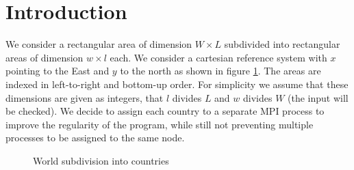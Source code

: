\section{Introduction}

We consider a rectangular area of dimension $W \times L$ subdivided into rectangular areas of dimension $w \times l$ each. We consider a cartesian reference system with $x$ pointing to the East and $y$ to the north as shown in figure \ref{fig:area_subdivision}. The areas are indexed in left-to-right and bottom-up order.
For simplicity we assume that these dimensions are given as integers, that $l$ divides $L$ and $w$ divides $W$ (the input will be checked).
We decide to assign each country to a separate MPI process to improve the regularity of the program, while still not preventing multiple processes to be assigned to the same node.
\begin{figure}[h]
    \centering
    \begin{subfigure}[c]{0.7\textwidth}
    \end{subfigure}
    \begin{subfigure}[c]{0.25\textwidth}
    \end{subfigure}
    \caption{World subdivision into countries}
    \label{fig:area_subdivision}
\end{figure}

